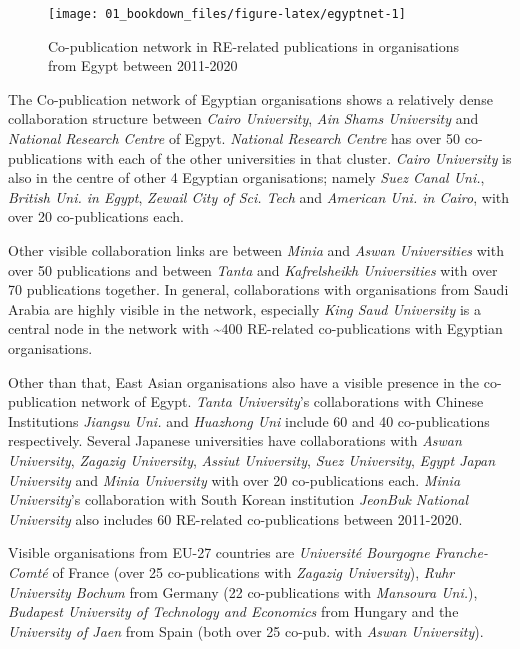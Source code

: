 \documentclass[
]{book}
\begin{document}
\begin{figure}
\texttt{[image: 01\_bookdown\_files/figure-latex/egyptnet-1]} \caption{Co-publication network in RE-related publications in organisations from Egypt between 2011-2020}\label{fig:egyptnet}
\end{figure}

The Co-publication network of Egyptian organisations shows a relatively dense collaboration structure between \emph{Cairo University}, \emph{Ain Shams University} and \emph{National Research Centre} of Egpyt. \emph{National Research Centre} has over 50 co-publications with each of the other universities in that cluster. \emph{Cairo University} is also in the centre of other 4 Egyptian organisations; namely \emph{Suez Canal Uni.}, \emph{British Uni. in Egypt}, \emph{Zewail City of Sci. Tech} and \emph{American Uni. in Cairo}, with over 20 co-publications each.

Other visible collaboration links are between \emph{Minia} and \emph{Aswan Universities} with over 50 publications and between \emph{Tanta} and \emph{Kafrelsheikh Universities} with over 70 publications together. In general, collaborations with organisations from Saudi Arabia are highly visible in the network, especially \emph{King Saud University} is a central node in the network with \textasciitilde400 RE-related co-publications with Egyptian organisations.

Other than that, East Asian organisations also have a visible presence in the co-publication network of Egypt. \emph{Tanta University}'s collaborations with Chinese Institutions \emph{Jiangsu Uni.} and \emph{Huazhong Uni} include 60 and 40 co-publications respectively. Several Japanese universities have collaborations with \emph{Aswan University}, \emph{Zagazig University}, \emph{Assiut University}, \emph{Suez University}, \emph{Egypt Japan University} and \emph{Minia University} with over 20 co-publications each. \emph{Minia University}'s collaboration with South Korean institution \emph{JeonBuk National University} also includes 60 RE-related co-publications between 2011-2020.

Visible organisations from EU-27 countries are \emph{Université Bourgogne Franche-Comté} of France (over 25 co-publications with \emph{Zagazig University}), \emph{Ruhr University Bochum} from Germany (22 co-publications with \emph{Mansoura Uni.}), \emph{Budapest University of Technology and Economics} from Hungary and the \emph{University of Jaen} from Spain (both over 25 co-pub. with \emph{Aswan University}).
\end{document}
